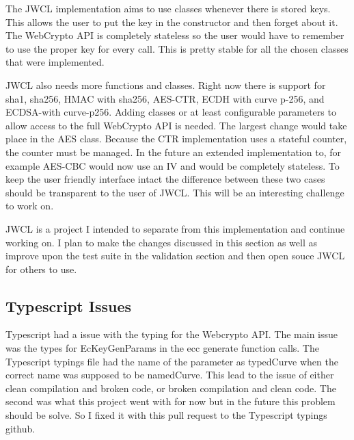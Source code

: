 The JWCL implementation aims to use classes whenever there is stored keys. This allows the user to put the key in the constructor and then forget about it. The WebCrypto API is completely stateless so the user would have to remember to use the proper key for every call. This is pretty stable for all the chosen classes that were implemented.


JWCL also needs more functions and classes. Right now there is support for sha1, sha256, HMAC with sha256, AES-CTR, ECDH with curve p-256, and ECDSA-with curve-p256. Adding classes or at least configurable parameters to allow access to the full WebCrypto API is needed. The largest change would take place in the AES class. Because the CTR implementation uses a stateful counter, the counter must be managed. In the future an extended implementation to, for example AES-CBC would now use an IV and would be completely stateless. To keep the user friendly interface intact the difference between these two cases should be transparent to the user of JWCL. This will be an interesting challenge to work on. 


JWCL is a project I intended to separate from this implementation and continue working on. I plan to make the changes discussed in this section as well as improve upon the test suite in the validation section and then open souce JWCL for others to use.


\subsection{Typescript Issues}


Typescript had a issue with the typing for the Webcrypto API. The main issue was the types for EcKeyGenParams in the ecc generate function calls. The Typescript typings file had the name of the parameter as typedCurve when the correct name was supposed to be namedCurve. This lead to the issue of either clean compilation and broken code, or broken compilation and clean code. The second was what this project went with for now but in the future this problem should be solve. So I fixed it with this pull request to the Typescript typings github. \cite{ts-pull} 



